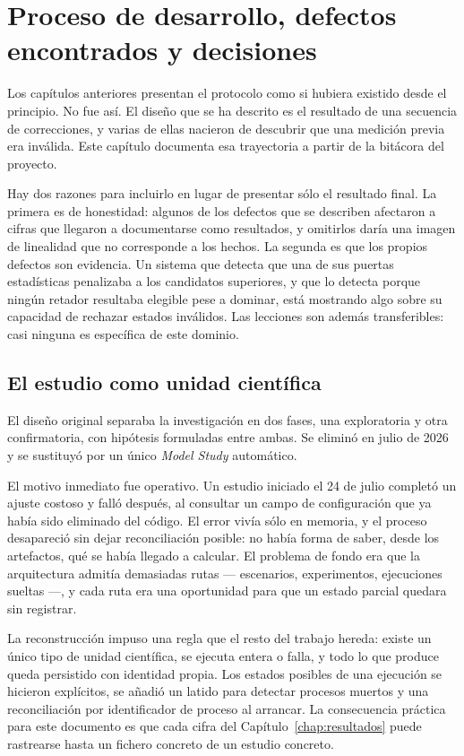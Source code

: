 \chapter{Proceso de desarrollo, defectos encontrados y decisiones}
\label{chap:desarrollo}

Los capítulos anteriores presentan el protocolo como si hubiera existido desde el principio. No fue
así. El diseño que se ha descrito es el resultado de una secuencia de correcciones, y varias de
ellas nacieron de descubrir que una medición previa era inválida. Este capítulo documenta esa
trayectoria a partir de la bitácora del proyecto.

Hay dos razones para incluirlo en lugar de presentar sólo el resultado final. La primera es de
honestidad: algunos de los defectos que se describen afectaron a cifras que llegaron a documentarse
como resultados, y omitirlos daría una imagen de linealidad que no corresponde a los hechos. La
segunda es que los propios defectos son evidencia. Un sistema que detecta que una de sus puertas
estadísticas penalizaba a los candidatos superiores, y que lo detecta porque ningún retador
resultaba elegible pese a dominar, está mostrando algo sobre su capacidad de rechazar estados
inválidos. Las lecciones son además transferibles: casi ninguna es específica de este dominio.

\section{El estudio como unidad científica}

El diseño original separaba la investigación en dos fases, una exploratoria y otra confirmatoria,
con hipótesis formuladas entre ambas. Se eliminó en julio de 2026 y se sustituyó por un único
\textit{Model Study} automático.

El motivo inmediato fue operativo. Un estudio iniciado el 24 de julio completó un ajuste costoso y
falló después, al consultar un campo de configuración que ya había sido eliminado del código. El
error vivía sólo en memoria, y el proceso desapareció sin dejar reconciliación posible: no había
forma de saber, desde los artefactos, qué se había llegado a calcular. El problema de fondo era que
la arquitectura admitía demasiadas rutas --- escenarios, experimentos, ejecuciones sueltas ---, y
cada ruta era una oportunidad para que un estado parcial quedara sin registrar.

La reconstrucción impuso una regla que el resto del trabajo hereda: existe un único tipo de unidad
científica, se ejecuta entera o falla, y todo lo que produce queda persistido con identidad propia.
Los estados posibles de una ejecución se hicieron explícitos, se añadió un latido para detectar
procesos muertos y una reconciliación por identificador de proceso al arrancar. La consecuencia
práctica para este documento es que cada cifra del Capítulo~\ref{chap:resultados} puede rastrearse
hasta un fichero concreto de un estudio concreto.

